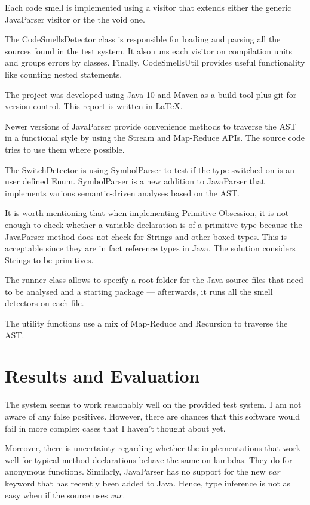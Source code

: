 \documentclass[a4paper]{article}
\begin{document}
Each code smell is implemented using a visitor that extends either
the generic JavaParser visitor or the the void one.

The CodeSmellsDetector class is responsible for loading and parsing all
the sources found in the test system.
It also runs each visitor on compilation units and
groups errors by classes.
Finally, CodeSmellsUtil provides useful functionality like counting
nested statements.

The project was developed using Java 10 and Maven as a build tool plus git for
version control. This report is written in \LaTeX.

Newer versions of JavaParser provide convenience methods to traverse the AST
in a functional style by using the Stream and Map-Reduce APIs.
The source
code tries to use them where possible.

The SwitchDetector is using SymbolParser to test if the type switched on
is an user defined Enum.
SymbolParser is a new addition to JavaParser that implements various
semantic-driven analyses
based on the AST.

It is worth mentioning that when implementing Primitive Obsession, it is not
enough to check whether a variable declaration is of a primitive type because
the JavaParser method does not check for Strings and other boxed types.
This is acceptable since they are in fact reference types in Java.
The solution considers Strings to be primitives.

The runner class allows to specify a root folder for the Java source files
that need to be analysed and a starting package --- afterwards, it runs
all the smell detectors on each file.

The utility functions use a mix of Map-Reduce and Recursion to traverse the AST.

\section{Results and Evaluation}

The system seems to work reasonably well on the provided test system.
I am not
aware of any false positives. However, there are chances that this software
would fail in more complex cases that I haven't thought about yet.

Moreover, there is uncertainty regarding whether the implementations that work
well for typical method declarations behave the same on lambdas.
They do for anonymous functions.
Similarly, JavaParser has no support for the new $var$ keyword that has recently
been added to Java. Hence, type inference is not as easy when if the source
uses $var$.
\end{document}
